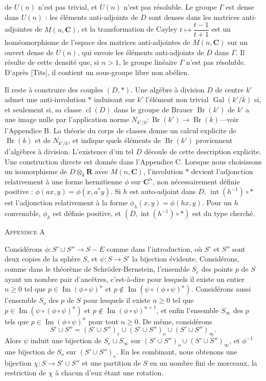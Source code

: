\documentclass[10pt,a4paper]{article}
\DeclareMathOperator{\Gal}{Gal}
\DeclareMathOperator{\Br}{Br}
\DeclareMathOperator{\cl}{cl}
\DeclareMathOperator{\ImOp}{Im}
\newcommand{\Intop}{\operatorname{int}}
\newcommand{\AppendixHeading}[1]{\par\vspace{1.2em}\begin{center}\textsc{Appendice #1}\end{center}\vspace{0.6em}\par}
\begin{document}
\newpage
de $U(n)$ n'est pas trivial, et $U(n)$ n'est pas résoluble. Le groupe $\Gamma$ est dense dans $U(n)$ :
les éléments anti-adjoints de $D$ sont denses dans les matrices anti-adjointes de $M(n,\mathbf{C})$,
et la transformation de Cayley $t\mapsto\dfrac{t-1}{t+1}$ est un homéomorphisme de l'espace des
matrices anti-adjointes de $M(n,\mathbf{C})$ sur un ouvert dense de $U(n)$, qui envoie les
éléments anti-adjoints de $D$ dans $\Gamma$. Il résulte de cette densité que, si $n>1$,
le groupe linéaire $\Gamma$ n'est pas résoluble. D'après [Tits], il contient un sous-groupe
libre non abélien.

Il reste à construire des couples $(D,*)$. Une algèbre à division $D$ de centre $k'$
admet une anti-involution $*$ induisant sur $k'$ l'élément non trivial $\Gal(k'/k)$ si,
et seulement si, sa classe $\cl(D)$ dans le groupe de Brauer $\Br(k')$ de $k'$ a une image
nulle par l'application norme $N_{k'/k}:\Br(k')\to\Br(k)$---voir l'Appendice B. La théorie
du corps de classes donne un calcul explicite de $\Br(k)$ et de $N_{k'/k}$, et indique quels
éléments de $\Br(k')$ proviennent d'algèbres à division. L'existence d'un tel $D$ découle de
cette description explicite. Une construction directe est donnée dans l'Appendice C. Lorsque
nous choisissons un isomorphisme de $D\otimes_k\mathbf{R}$ avec $M(n,\mathbf{C})$, l'involution $*$ devient
l'adjonction relativement à une forme hermitienne $\phi$ sur $\mathbf{C}^n$, non nécessairement définie
positive : $\phi(ax,y)=\phi(x,a^*y)$. Si $h$ est auto-adjoint dans $D$, $\Intop(h^{-1})\circ *$ est l'adjonction
relativement à la forme $\phi_h(x,y)=\phi(hx,y)$. Pour un $h$ convenable, $\phi_h$ est définie positive,
et $(D,\Intop(h^{-1})\circ *)$ est du type cherché.

\AppendixHeading{A}
Considérons $\phi:S'\cup S''\to S-E$ comme dans l'introduction, où $S'$ et $S''$ sont deux
copies de la sphère $S$, et $\psi:S\to S'$ la bijection évidente. Considérons, comme dans le
théorème de Schröder-Bernstein, l'ensemble $S_e$ des points $p$ de $S$ ayant un nombre pair
d'ancêtres, c'est-à-dire pour lesquels il existe un entier $n\geq0$ tel que $p\in\ImOp(\phi\circ\psi)^n$
et $p\notin\ImOp(\psi\circ(\phi\circ\psi)^n)$. Considérons aussi l'ensemble $S_o$ des $p$ de $S$ pour lesquels
il existe $n\geq0$ tel que $p\in\ImOp(\psi\circ(\phi\circ\psi)^n)$ et $p\notin\ImOp(\phi\circ\psi)^{n+1}$, et enfin l'ensemble $S_\infty$
des $p$ tels que $p\in\ImOp(\phi\circ\psi)^n$ pour tout $n\geq0$. De même, considérons
\[
S'\cup S''=(S'\cup S'')_e\cup(S'\cup S'')_o\cup(S'\cup S'')_\infty.
\]
Alors $\psi$ induit une bijection de $S_e\cup S_\infty$ sur $(S'\cup S'')_o\cup(S'\cup S'')_\infty$, et $\phi^{-1}$
une bijection de $S_o$ sur $(S'\cup S'')_e$. En les combinant, nous obtenons une bijection $\chi:S\to S'\cup S''$
et une partition de $S$ en un nombre fini de morceaux, la restriction de $\chi$ à chacun
d'eux étant une rotation.
\end{document}
